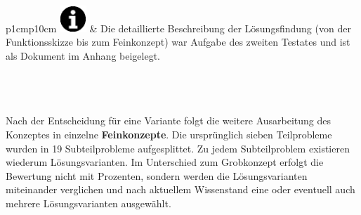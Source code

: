 \begin{tabular}{p{1cm}p{10cm}}
		{\includegraphics[width=1cm]{Enddokumentation/Varianten/Bilder/info_icon.png}}
	 & Die detaillierte Beschreibung der Lösungsfindung (von der Funktionsskizze bis zum Feinkonzept) war Aufgabe des zweiten Testates und ist als Dokument im Anhang beigelegt. \\
\end{tabular}\\
\\
\\
Nach der Entscheidung für eine Variante folgt die weitere Ausarbeitung des Konzeptes
in einzelne \textbf{Feinkonzepte}. Die ursprünglich sieben Teilprobleme wurden in 19 Subteilprobleme
aufgesplittet. Zu jedem Subteilproblem existieren wiederum Lösungsvarianten. Im Unterschied zum Grobkonzept erfolgt die Bewertung nicht mit Prozenten, sondern werden die Lösungsvarianten miteinander verglichen und nach aktuellem Wissenstand eine oder eventuell auch mehrere Lösungsvarianten ausgewählt. 


